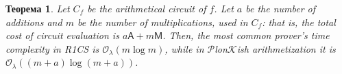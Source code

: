 \documentclass[12pt,a4paper,oneside]{book}
\theoremstyle{dplplain}
\newtheorem{theorem}{Теорема}[chapter]
\theoremstyle{dpldefinition}
\newtheorem{definition}[theorem]{Означення}%
\theoremstyle{dplremark}
\begin{document}
\begin{theorem}
    Let $C_f$ be the arithmetical circuit of $f$. Let $a$ be the number of
    additions and $m$ be the number of multiplications, used in $C_f$: that is,
    the total cost of circuit evaluation is $a\mathsf{A} + m\mathsf{M}$. Then,
    the most common prover's time complexity in R1CS is
    $\mathcal{O}_{\lambda}(m\log m)$, while in $\mathcal{P}$lon$\mathcal{K}$ish
    arithmetization it is $\mathcal{O}_{\lambda}((m+a)\log(m+a))$.
\end{theorem}



\end{document}

